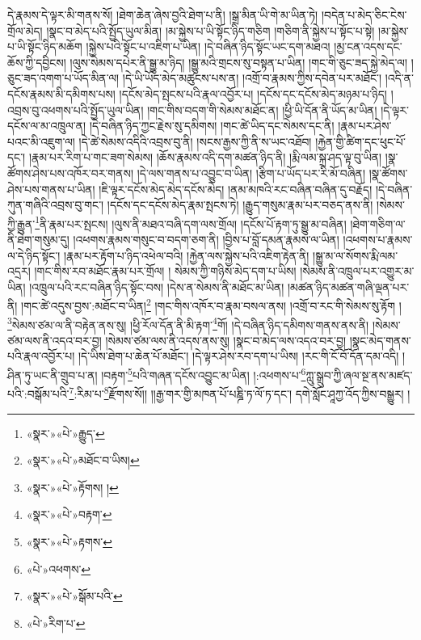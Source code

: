 དེ་རྣམས་དེ་ལྟར་མི་གནས་སོ། །ཐེག་ཆེན་ཞེས་བྱའི་ཐེག་པ་ནི། །སྒྲ་མིན་ཡི་གེ་མ་ཡིན་ཏེ། །བདེན་པ་མེད་ཅིང་ངེས་གྲོལ་མེད། །སྣང་བ་མེད་པའི་སྤྱོད་ཡུལ་མིན། །མ་སྐྱེས་པ་ཡི་སྟོང་ཉིད་གཅིག །གཅིག་ནི་སྐྱེས་པ་སྟོང་པ་སྟེ། །མ་སྐྱེས་པ་ཡི་སྟོང་ཉིད་མཆོག །སྐྱེས་པའི་སྟོང་པ་འཇིག་པ་ཡིན། །དེ་བཞིན་ཉིད་སྟོང་ཡང་དག་མཐའ། །མྱ་ངན་འདས་དང་ཆོས་ཀྱི་དབྱིངས། །ལུས་སེམས་དཔེར་ནི་སྒྱུ་མ་ཉིད། །སྒྱུ་མའི་གྲངས་སུ་བསྟན་པ་ཡིན། །གང་གི་ཅུང་ཟད་སྐྱེ་མེད་ལ། །ཅུང་ཟད་འགག་པ་ཡོད་མིན་ལ། །དེ་ཡི་ཡོད་མེད་མཚུངས་པས་ན། །འགྲོ་བ་རྣམས་ཀྱིས་དབེན་པར་མཐོང་། །འདི་ན་དངོས་རྣམས་མི་དམིགས་པས། །དངོས་མེད་སྤངས་པའི་རྣལ་འབྱོར་པ། །དངོས་དང་དངོས་མེད་མཉམ་པ་ཉིད། །འབྲས་བུ་འཕགས་པའི་སྤྱོད་ཡུལ་ཡིན། །གང་གིས་བདག་གི་སེམས་མཐོང་ན། །ཕྱི་ཡི་དོན་ནི་ཡོད་མ་ཡིན། །དེ་ལྟར་དངོས་ལ་མ་འཁྲུལ་ན། །དེ་བཞིན་ཉིད་ཀྱང་རྗེས་སུ་དམིགས། །གང་ཚེ་ཡིད་དང་སེམས་དང་ནི། །རྣམ་པར་ཤེས་པའང་མི་འཇུག་ལ། །དེ་ཚེ་སེམས་འདིའི་འབྲས་བུ་ནི། །སངས་རྒྱས་ཀྱི་ནི་ས་ཡང་འཐོབ། །རྐྱེན་གྱི་ཚིག་དང་ཕུང་པོ་དང་། །རྣམ་པར་རིག་པ་གང་ཟག་སེམས། །ཆོས་རྣམས་འདི་དག་མཚན་ཉིད་ནི། །རྨི་ལམ་སྐྲ་ཤད་ལྟ་བུ་ཡིན། །སྣ་ཚོགས་ཤེས་པས་འཁོར་བར་གནས། །དེ་ལས་གནས་པ་འབྱུང་བ་ཡིན། །རྩིག་པ་ཡོད་པར་རི་མོ་བཞིན། །སྣ་ཚོགས་ཤེས་པས་གནས་པ་ཡིན། །ཇི་ལྟར་དངོས་མེད་མེད་དངོས་མེད། །ནམ་མཁའི་རང་བཞིན་བཞིན་དུ་བརྗོད། །དེ་བཞིན་ཀུན་གཞིའི་འབྲས་བུ་གང་། །དངོས་དང་དངོས་མེད་རྣམ་སྤངས་ཏེ། །རྒྱུད་གསུམ་རྣམ་པར་བཅད་ནས་ནི། །སེམས་ཀྱི་རྒྱུན་\footnote{«སྣར་»«པེ་»རྒྱུད་}ནི་རྣམ་པར་སྤངས། །ལུས་ནི་མཐའ་བཞི་དག་ལས་གྲོལ། །དངོས་པོ་རྟག་ཏུ་སྒྱུ་མ་བཞིན། །ཐེག་གཅིག་ལ་ནི་ཐེག་གསུམ་དུ། །འཕགས་རྣམས་གསུང་བ་བདག་ཅག་ནི། །བྱིས་པ་བློ་དམན་རྣམས་ལ་ཡིན། །འཕགས་པ་རྣམས་ལ་དེ་ཉིད་སྟོང་། །རྣམ་པར་རྟོག་པ་ཉིད་འཕེལ་བའི། །རྐྱེན་ལས་སྐྱེས་པའི་འཇིག་རྟེན་ནི། །སྒྱུ་མ་ལ་སོགས་རྨི་ལམ་འདྲར། །གང་གིས་རབ་མཐོང་རྣམ་པར་གྲོལ། །
སེམས་ཀྱི་གཉིས་མེད་དག་པ་ཡིས། །སེམས་ནི་འཁྲུལ་པར་འགྱུར་མ་ཡིན། །འཁྲུལ་པའི་རང་བཞིན་ཉིད་སྟོང་བས། །དེས་ན་སེམས་ནི་མཐོང་མ་ཡིན། །མཚན་ཉིད་མཚན་གཞི་ལྡན་པར་ནི། །གང་ཚེ་འདུས་བྱས་:མཐོང་བ་ཡིན།\footnote{«སྣར་»«པེ་»མཐོང་བ་ཡིས།} །གང་གིས་འཁོར་བ་རྣམ་བསལ་ནས། །འགྲོ་བ་རང་གི་སེམས་སུ་རྟོག །\footnote{«སྣར་»«པེ་»རྟོགས། །}སེམས་ཙམ་ལ་ནི་བརྟེན་ནས་སུ། །ཕྱི་རོལ་དོན་ནི་མི་རྟག་\footnote{«སྣར་»«པེ་»བརྟག་}གོ། །དེ་བཞིན་ཉིད་དམིགས་གནས་ནས་ནི། །སེམས་ཙམ་ལས་ནི་འདའ་བར་བྱ། །སེམས་ཙམ་ལས་ནི་འདས་ནས་སུ། །སྣང་བ་མེད་ལས་འདའ་བར་བྱ། །སྣང་མེད་གནས་པའི་རྣལ་འབྱོར་པ། །དེ་ཡིས་ཐེག་པ་ཆེན་པོ་མཐོང་། །དེ་ལྟར་ཤེས་རབ་དག་པ་ཡིས། །རང་གི་ངོ་བོ་དོན་དམ་འདི། །ཤིན་ཏུ་ཡང་ནི་གྲུབ་པ་ན། །བརྟག་\footnote{«སྣར་»«པེ་»རྟགས་}པའི་གཞན་དངོས་འབྱུང་མ་ཡིན། །:འཕགས་པ་\footnote{«པེ་»འཕགས་}ཀླུ་སྒྲུབ་ཀྱི་ཞལ་སྔ་ནས་མཛད་པའི་:བསྒོམ་པའི་\footnote{«སྣར་»«པེ་»སྒོམ་པའི་}:རིམ་པ་\footnote{«པེ་»རིག་པ་}རྫོགས་སོ།། །།རྒྱ་གར་གྱི་མཁན་པོ་པཎྜི་ཏ་ལོ་ཏ་དང་། དགེ་སློང་ཤཱཀྱ་འོད་ཀྱིས་བསྒྱུར། ། 